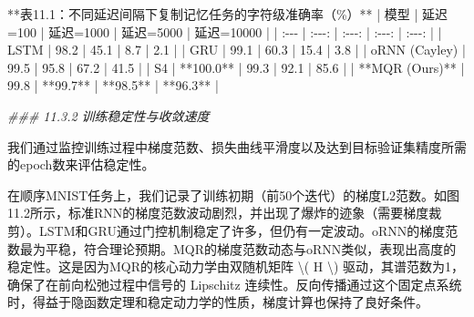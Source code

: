 \documentclass[
  12pt,
]{article}
\newenvironment{Shaded}{}{}
\newcommand{\CommentTok}[1]{\textcolor[rgb]{0.38,0.63,0.69}{\textit{#1}}}
\newcommand{\DecValTok}[1]{\textcolor[rgb]{0.25,0.63,0.44}{#1}}
\newcommand{\FloatTok}[1]{\textcolor[rgb]{0.25,0.63,0.44}{#1}}
\newcommand{\NormalTok}[1]{#1}
\newcommand{\OperatorTok}[1]{\textcolor[rgb]{0.40,0.40,0.40}{#1}}
\begin{document}
\begin{Shaded}
\begin{Highlighting}[]
\OperatorTok{**}\NormalTok{表}\FloatTok{11.1}\NormalTok{：不同延迟间隔下复制记忆任务的字符级准确率（}\OperatorTok{\%}\NormalTok{）}\OperatorTok{**}
\OperatorTok{|}\NormalTok{ 模型 }\OperatorTok{|}\NormalTok{ 延迟}\OperatorTok{=}\DecValTok{100} \OperatorTok{|}\NormalTok{ 延迟}\OperatorTok{=}\DecValTok{1000} \OperatorTok{|}\NormalTok{ 延迟}\OperatorTok{=}\DecValTok{5000} \OperatorTok{|}\NormalTok{ 延迟}\OperatorTok{=}\DecValTok{10000} \OperatorTok{|}
\OperatorTok{|}\NormalTok{ :}\OperatorTok{{-}{-}{-}} \OperatorTok{|}\NormalTok{ :}\OperatorTok{{-}{-}{-}}\NormalTok{: }\OperatorTok{|}\NormalTok{ :}\OperatorTok{{-}{-}{-}}\NormalTok{: }\OperatorTok{|}\NormalTok{ :}\OperatorTok{{-}{-}{-}}\NormalTok{: }\OperatorTok{|}\NormalTok{ :}\OperatorTok{{-}{-}{-}}\NormalTok{: }\OperatorTok{|}
\OperatorTok{|}\NormalTok{ LSTM }\OperatorTok{|} \FloatTok{98.2} \OperatorTok{|} \FloatTok{45.1} \OperatorTok{|} \FloatTok{8.7} \OperatorTok{|} \FloatTok{2.1} \OperatorTok{|}
\OperatorTok{|}\NormalTok{ GRU }\OperatorTok{|} \FloatTok{99.1} \OperatorTok{|} \FloatTok{60.3} \OperatorTok{|} \FloatTok{15.4} \OperatorTok{|} \FloatTok{3.8} \OperatorTok{|}
\OperatorTok{|}\NormalTok{ oRNN (Cayley) }\OperatorTok{|} \FloatTok{99.5} \OperatorTok{|} \FloatTok{95.8} \OperatorTok{|} \FloatTok{67.2} \OperatorTok{|} \FloatTok{41.5} \OperatorTok{|}
\OperatorTok{|}\NormalTok{ S4 }\OperatorTok{|} \OperatorTok{**}\FloatTok{100.0}\OperatorTok{**} \OperatorTok{|} \FloatTok{99.3} \OperatorTok{|} \FloatTok{92.1} \OperatorTok{|} \FloatTok{85.6} \OperatorTok{|}
\OperatorTok{|} \OperatorTok{**}\NormalTok{MQR (Ours)}\OperatorTok{**} \OperatorTok{|} \FloatTok{99.8} \OperatorTok{|} \OperatorTok{**}\FloatTok{99.7}\OperatorTok{**} \OperatorTok{|} \OperatorTok{**}\FloatTok{98.5}\OperatorTok{**} \OperatorTok{|} \OperatorTok{**}\FloatTok{96.3}\OperatorTok{**} \OperatorTok{|}

\CommentTok{\#\#\# 11.3.2 训练稳定性与收敛速度}

\NormalTok{我们通过监控训练过程中梯度范数、损失曲线平滑度以及达到目标验证集精度所需的epoch数来评估稳定性。}

\NormalTok{在顺序MNIST任务上，我们记录了训练初期（前}\DecValTok{50}\NormalTok{个迭代）的梯度L2范数。如图}\FloatTok{11.2}\NormalTok{所示，标准RNN的梯度范数波动剧烈，并出现了爆炸的迹象（需要梯度裁剪）。LSTM和GRU通过门控机制稳定了许多，但仍有一定波动。oRNN的梯度范数最为平稳，符合理论预期。MQR的梯度范数动态与oRNN类似，表现出高度的稳定性。这是因为MQR的核心动力学由双随机矩阵 }\OperatorTok{\textbackslash{}}\NormalTok{( H }\OperatorTok{\textbackslash{}}\NormalTok{) 驱动，其谱范数为}\DecValTok{1}\NormalTok{，确保了在前向松弛过程中信号的 Lipschitz 连续性。反向传播通过这个固定点系统时，得益于隐函数定理和稳定动力学的性质，梯度计算也保持了良好条件。}


\end{Highlighting}
\end{Shaded}
\end{document}
